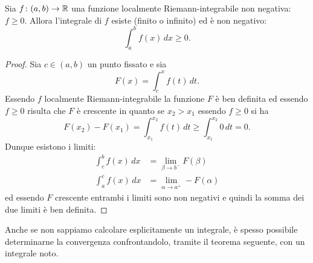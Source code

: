 \begin{theorem}
\label{th:integrabilita_positive}
\mymark{**}
Sia $f\colon (a,b)\to \mathbb R$ una funzione localmente Riemann-integrabile
non negativa: $f\ge 0$. Allora l'integrale di $f$ esiste (finito o infinito)
ed è non negativo:
\[
  \int_a^b f(x)\, dx \ge 0.
\]
\end{theorem}
%
\begin{proof}
\mymark{**}
Sia $c\in (a,b)$ un punto fissato e sia
\[
  F(x) = \int_c^x f(t)\, dt.
\]
Essendo $f$ localmente Riemann-integrabile la funzione $F$ è ben definita
ed essendo $f\ge 0$ risulta che $F$ è crescente in quanto se $x_2>x_1$
essendo $f\ge 0$ si ha
\[
  F(x_2)-F(x_1) = \int_{x_1}^{x_2} f(t)\, dt \ge \int_{x_1}^{x_2} 0\, dt = 0.
\]
Dunque esistono i limiti:
\begin{align*}
  \int_c^b f(x)\, dx  &= \lim_{\beta\to b^-} F(\beta)\\
  \int_a^c f(x)\, dx  &= \lim_{\alpha\to a^+} -F(\alpha)
\end{align*}
ed essendo $F$ crescente entrambi i limiti sono non negativi e quindi
la somma dei due limiti è ben definita.
\end{proof}

Anche se non sappiamo calcolare esplicitamente un integrale,
è spesso possibile determinarne la convergenza confrontandolo,
tramite il teorema seguente, con un integrale noto.

